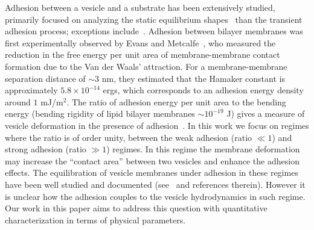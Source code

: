 \documentclass[prf,superscriptaddress,showpacs]{revtex4-1}
\begin{document}
Adhesion between a vesicle and a substrate has been extensively studied,
primarily focused on analyzing the static equilibrium
shapes~\cite{Seifert1990_PRA, ShiFengGao2006_ActaMechSin,
LinFreund2007_IntJSolidsStructures, das2008adhesion, zhang2009phase}
than the transient adhesion process; exceptions
include~\cite{cantat1999lift, suk-sei2001, BlountMiksisDavis2013_PRSa}.
%
% 
% 
Adhesion between bilayer membranes was first experimentally observed by
Evans and Metcalfe~\cite{EvansMetcalfe1984_BJ}, who measured the
reduction in the free energy per unit area of membrane-membrane contact
formation due to the Van der Waals' attraction. For a membrane-membrane
separation distance of $\sim 3$ nm, they estimated that the Hamaker
constant is approximately $5.8\times 10^{-14}$ ergs, which corresponds
to an adhesion energy density around $1$ mJ/m$^2$. The ratio of adhesion
energy per unit area to the bending energy (bending rigidity of lipid
bilayer membranes $\sim 10^{-19}$ J) gives a measure of vesicle
deformation in the presence of
adhesion~\cite{RamachandranAndersonLealIsraelachvili2010_Langmuir}. In
this work we focus on regimes where the ratio is of order unity, between
the weak adhesion (ratio $\ll 1$) and strong adhesion (ratio $\gg 1$)
regimes.  In this regime the membrane deformation may increase the
``contact area'' between two vesicles and enhance the adhesion effects.
The equilibration of vesicle membranes under adhesion in these regimes
have been well studied and documented
(see~\cite{RamachandranAndersonLealIsraelachvili2010_Langmuir} and
references therein). However it is unclear how the adhesion couples to
the vesicle hydrodynamics in such regime.  Our work in this paper aims
to address this question with quantitative characterization in terms of
physical parameters.
\end{document}
